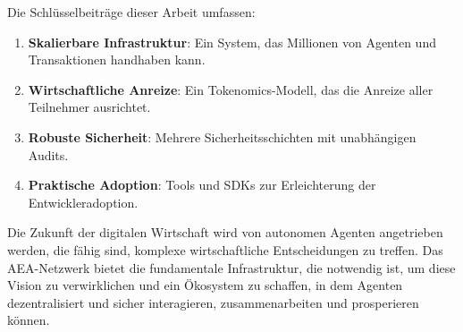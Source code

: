 \documentclass[12pt,a4paper]{article}
\begin{document}
Die Schlüsselbeiträge dieser Arbeit umfassen:

\begin{enumerate}
\item \textbf{Skalierbare Infrastruktur}: Ein System, das Millionen von Agenten und Transaktionen handhaben kann.
\item \textbf{Wirtschaftliche Anreize}: Ein Tokenomics-Modell, das die Anreize aller Teilnehmer ausrichtet.
\item \textbf{Robuste Sicherheit}: Mehrere Sicherheitsschichten mit unabhängigen Audits.
\item \textbf{Praktische Adoption}: Tools und SDKs zur Erleichterung der Entwickleradoption.
\end{enumerate}

Die Zukunft der digitalen Wirtschaft wird von autonomen Agenten angetrieben werden, die fähig sind, komplexe wirtschaftliche Entscheidungen zu treffen. Das AEA-Netzwerk bietet die fundamentale Infrastruktur, die notwendig ist, um diese Vision zu verwirklichen und ein Ökosystem zu schaffen, in dem Agenten dezentralisiert und sicher interagieren, zusammenarbeiten und prosperieren können.
\end{document}
